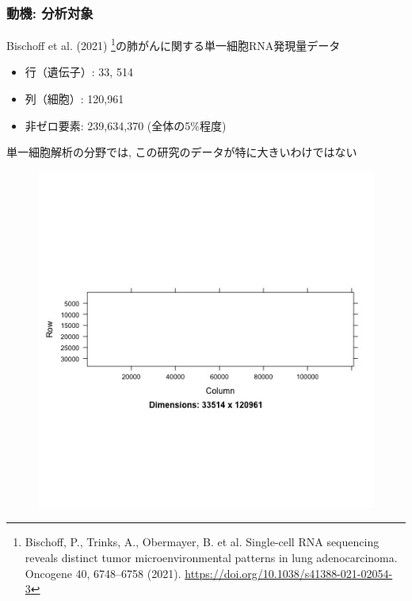 \documentclass[dvipdfmx, dvipsnames]{beamer}
\begin{document}
\begin{frame}
\frametitle{動機: 分析対象}
Bischoff et al. (2021)  \footnote{Bischoff, P., Trinks, A., Obermayer, B. et al. Single-cell RNA sequencing reveals distinct tumor microenvironmental patterns in lung adenocarcinoma. Oncogene 40, 6748–6758 (2021). \url{https://doi.org/10.1038/s41388-021-02054-3}}の肺がんに関する単一細胞RNA発現量データ
\begin{itemize}
\item 行（遺伝子）: 33, 514
\item 列（細胞）: 120,961
\item 非ゼロ要素: 239,634,370 (全体の5\%程度)
\end{itemize}
単一細胞解析の分野では, この研究のデータが特に大きいわけではない
\begin{figure}
\includegraphics[height=0.4\textheight, clip]{./img/image_sp.jpg}
\end{figure}
\end{frame}
\end{document}
